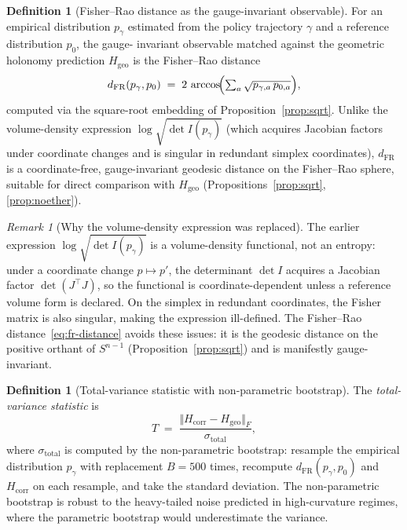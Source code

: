 \documentclass[11pt,a4paper]{article}
\theoremstyle{plain}
\theoremstyle{definition}
\newtheorem{definition}[theorem]{Definition}
\theoremstyle{remark}
\newtheorem{remark}[theorem]{Remark}
\newcommand{\normF}[1]{\mathopen{}\Vert#1\mathclose{}\Vert_{\!F}}
\begin{document}
\begin{definition}[Fisher--Rao distance as the gauge-invariant observable]
\label{def:hemp}
For an empirical distribution $p_\gamma$ estimated from the policy
trajectory $\gamma$ and a reference distribution $p_0$, the gauge-
invariant observable matched against the geometric holonomy prediction
$H_{\mathrm{geo}}$ is the Fisher--Rao distance
\begin{equation}\label{eq:fr-distance}
  d_{\mathrm{FR}}(p_\gamma, p_0) \;=\; 2\,\arccos\!\Bigl(\textstyle\sum_a \sqrt{p_{\gamma,a}\,p_{0,a}}\Bigr),
\end{equation}
computed via the square-root embedding of
Proposition~\ref{prop:sqrt}. Unlike the volume-density expression
$\log\sqrt{\det I(p_\gamma)}$ (which acquires Jacobian factors under
coordinate changes and is singular in redundant simplex coordinates),
$d_{\mathrm{FR}}$ is a coordinate-free, gauge-invariant geodesic
distance on the Fisher--Rao sphere, suitable for direct comparison
with $H_{\mathrm{geo}}$ (Propositions~\ref{prop:sqrt},
\ref{prop:noether}).
\end{definition}

\begin{remark}[Why the volume-density expression was replaced]
The earlier expression $\log\sqrt{\det I(p_\gamma)}$ is a
volume-density functional, not an entropy: under a coordinate change
$p \mapsto p'$, the determinant $\det I$ acquires a Jacobian factor
$\det(J^\top J)$, so the functional is coordinate-dependent unless a
reference volume form is declared. On the simplex in redundant
coordinates, the Fisher matrix is also singular, making the
expression ill-defined. The Fisher--Rao distance~\eqref{eq:fr-distance}
avoids these issues: it is the geodesic distance on the
positive orthant of $S^{n-1}$ (Proposition~\ref{prop:sqrt}) and is
manifestly gauge-invariant.
\end{remark}

\begin{definition}[Total-variance statistic with non-parametric
bootstrap]
\label{def:tstat}
The \emph{total-variance statistic} is
\begin{equation}
  T \;=\; \frac{\normF{H_{\mathrm{corr}} - H_{\mathrm{geo}}}}{\sigma_{\mathrm{total}}},
\end{equation}
where $\sigma_{\mathrm{total}}$ is computed by the non-parametric
bootstrap: resample the empirical distribution $p_\gamma$ with
replacement $B=500$ times, recompute $d_{\mathrm{FR}}(p_\gamma, p_0)$
and $H_{\mathrm{corr}}$ on each resample, and take the standard
deviation. The non-parametric bootstrap is robust to the heavy-tailed
noise predicted in high-curvature regimes, where the parametric
bootstrap would underestimate the variance.
\end{definition}
\end{document}

